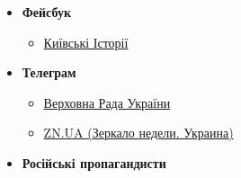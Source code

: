 \begin{itemize}
\item \textbf{Фейсбук}

\begin{itemize}
\item \href{https://www.facebook.com/groups/story.kiev.ua}{Київські Історії}
\end{itemize}

\item \textbf{Телеграм}

\begin{itemize}
\item \href{https://t.me/verkhovnaradaofukraine}{Верховна Рада України}
\item \href{https://t.me/znua_live}{ZN.UA (Зеркало недели. Украина)}
\end{itemize}

\item \textbf{Російські пропагандисти}

\end{itemize}
